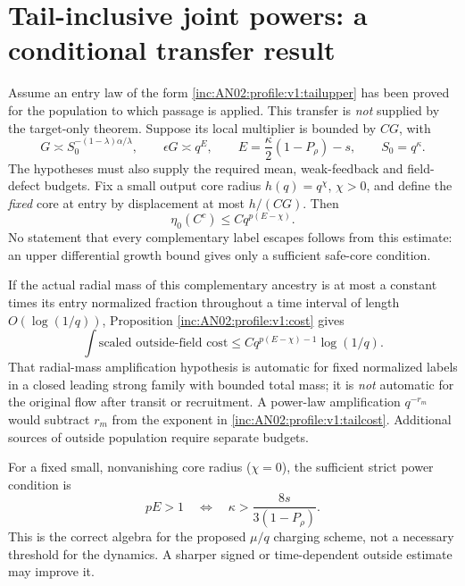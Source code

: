 \documentclass[11pt]{article}
\numberwithin{equation}{section}
\theoremstyle{remark}\newtheorem{remark}[theorem]{Remark}
\begin{document}
\section{Tail-inclusive joint powers: a conditional transfer result}
Assume an entry law of the form \eqref{inc:AN02:profile:v1:tailupper} has been proved for the population to which passage is applied. This transfer is \emph{not} supplied by the target-only theorem. Suppose its local multiplier is bounded by $C G$, with
\[
 G\asymp S_0^{-(1-\lambda)\alpha/\lambda},\qquad
 \epsilon G\asymp q^{E},\qquad
 E=\frac\kappa2(1-P_\rho)-s,\qquad S_0=q^\kappa.
\]
The hypotheses must also supply the required mean, weak-feedback and field-defect budgets. Fix a small output core radius $h(q)=q^\chi$, $\chi>0$, and define the \emph{fixed} core at entry by displacement at most $h/(C G)$. Then
\begin{equation}\label{inc:AN02:profile:v1:badmass}
 \eta_0(C^c)\le Cq^{p(E-\chi)}.
\end{equation}
No statement that every complementary label escapes follows from this estimate: an upper differential growth bound gives only a sufficient safe-core condition.

If the actual radial mass of this complementary ancestry is at most a constant times its entry normalized fraction throughout a time interval of length $O(\log(1/q))$, Proposition \ref{inc:AN02:profile:v1:cost} gives
\begin{equation}\label{inc:AN02:profile:v1:tailcost}
 \int \text{scaled outside-field cost}
 \le Cq^{p(E-\chi)-1}\log(1/q).
\end{equation}
That radial-mass amplification hypothesis is automatic for fixed normalized labels in a closed leading strong family with bounded total mass; it is \emph{not} automatic for the original flow after transit or recruitment. A power-law amplification $q^{-r_m}$ would subtract $r_m$ from the exponent in \eqref{inc:AN02:profile:v1:tailcost}. Additional sources of outside population require separate budgets.

For a fixed small, nonvanishing core radius ($\chi=0$), the sufficient strict power condition is
\begin{equation}\label{inc:AN02:profile:v1:threshold}
 pE>1\quad\Longleftrightarrow\quad
 \kappa>\frac{8s}{3(1-P_\rho)}.
\end{equation}
This is the correct algebra for the proposed $\mu/q$ charging scheme, not a necessary threshold for the dynamics. A sharper signed or time-dependent outside estimate may improve it.
\end{document}
